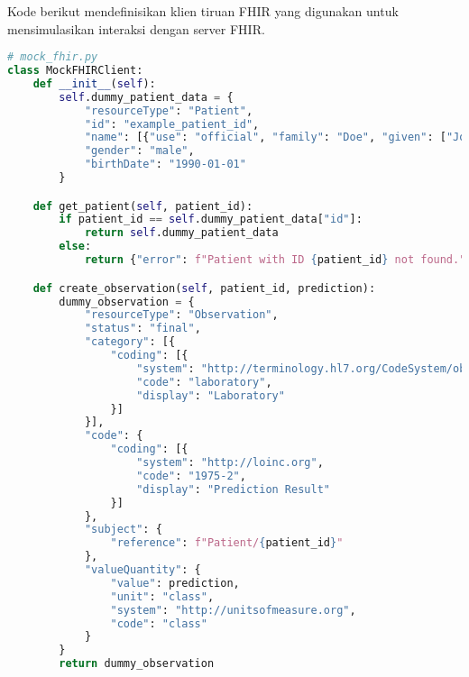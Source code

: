Kode berikut mendefinisikan klien tiruan FHIR yang digunakan untuk mensimulasikan interaksi dengan server FHIR.

\begin{lstlisting}[language=Python, caption=Mock FHIR Client Implementation]
# mock_fhir.py
class MockFHIRClient:
    def __init__(self):
        self.dummy_patient_data = {
            "resourceType": "Patient",
            "id": "example_patient_id",
            "name": [{"use": "official", "family": "Doe", "given": ["John"]}],
            "gender": "male",
            "birthDate": "1990-01-01"
        }

    def get_patient(self, patient_id):
        if patient_id == self.dummy_patient_data["id"]:
            return self.dummy_patient_data
        else:
            return {"error": f"Patient with ID {patient_id} not found."}

    def create_observation(self, patient_id, prediction):
        dummy_observation = {
            "resourceType": "Observation",
            "status": "final",
            "category": [{
                "coding": [{
                    "system": "http://terminology.hl7.org/CodeSystem/observation-category",
                    "code": "laboratory",
                    "display": "Laboratory"
                }]
            }],
            "code": {
                "coding": [{
                    "system": "http://loinc.org",
                    "code": "1975-2",
                    "display": "Prediction Result"
                }]
            },
            "subject": {
                "reference": f"Patient/{patient_id}"
            },
            "valueQuantity": {
                "value": prediction,
                "unit": "class",
                "system": "http://unitsofmeasure.org",
                "code": "class"
            }
        }
        return dummy_observation
\end{lstlisting}